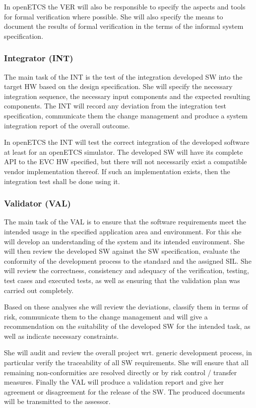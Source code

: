 In openETCS the VER will also be responsible to specify the aspects and tools
for formal verification where possible. She will also specify the means to
document the results of formal verification in the terms of the informal system
specification.

\subsubsection{Integrator (INT)}
\label{sec:integrator}

The main task of the INT is the test of the integration developed SW into the
target HW based on the design specification. She will specify the necessary
integration sequence, the necessary input components and the expected resulting
components. The INT will record any deviation from the integration test
specification, communicate them the change management and produce a system
integration report of the overall outcome.

In openETCS the INT will test the correct integration of the developed software
at least for an openETCS simulator. The developed SW will have its
complete API to the EVC HW specified, but there will not necessarily exist a
compatible vendor implementation thereof. If such an implementation exists, then
the integration test shall be done using it.

\subsubsection{Validator (VAL)}
\label{sec:validator}

The main task of the VAL is to ensure that the software requirements meet the
intended usage in the specified application area and environment. For this she
will develop an understanding of the system and its intended environment. She
will then review the developed SW against the SW specification, evaluate the
conformity of the development process to the standard and the assigned SIL. She
will review the correctness, consistency and adequacy of the verification,
testing, test cases and executed tests, as well as ensuring that the validation
plan was carried out completely.

Based on these analyses she will review the deviations, classify them in terms
of risk, communicate them to the change management and will give a
recommendation on the suitability of the developed SW for the intended task, as
well as indicate necessary constraints.

She will audit and review the overall project wrt. generic development process,
in particular verify the traceability of all SW requirements. She will ensure
that all remaining non-conformities are resolved directly or by risk control /
transfer measures. Finally the VAL will produce a validation report and give her
agreement or disagreement for the release of the SW. The produced documents will
be transmitted to the assessor.

